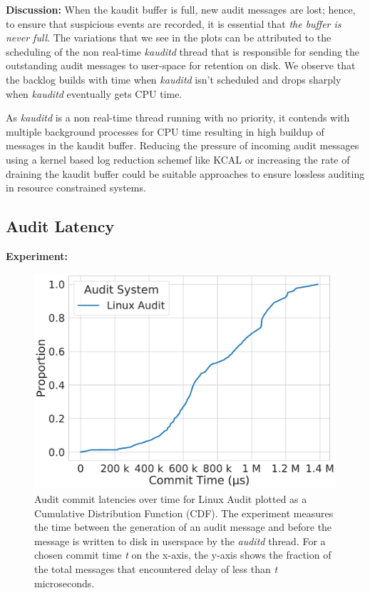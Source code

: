 \textbf{Discussion:}
When the kaudit buffer is full, new audit messages are lost; hence, to ensure that suspicious events are recorded, it is essential that \textit{the buffer is never full}.
The variations that we see in the plots can be attributed to the scheduling of the non real-time \textit{kauditd} thread that is responsible for sending the outstanding audit messages to user-space for retention on disk. We observe that the backlog builds with time when \textit{kauditd} isn't scheduled and drops sharply when \textit{kauditd} eventually gets CPU time. 

As \textit{kauditd} is a non real-time thread running with no priority, it contends with multiple background processes for CPU time resulting in high buildup of messages in the kaudit buffer. Reducing the pressure of incoming audit messages using a kernel based log reduction schemef like KCAL \cite{maUsenix18} or increasing the rate of draining the kaudit buffer could be suitable approaches to ensure lossless auditing in resource constrained systems.

\subsection{Audit Latency}
\textbf{Experiment:}

\begin{figure}[tbp]
    \centering
    \includegraphics[width=0.9\linewidth,keepaspectratio,scale=0.9]{fig/Commit_latencies_cdf.pdf}
    \caption{\label{fig:eval_latency}Audit commit latencies over time for Linux Audit plotted as a Cumulative Distribution Function (CDF). The experiment measures the time between the generation of an audit message and before the message is written to disk in userspace by the \textit{auditd} thread. For a chosen commit time \textit{t} on the x-axis, the y-axis shows the fraction of the total messages that encountered delay of less than \textit{t} microseconds.}
\end{figure}

